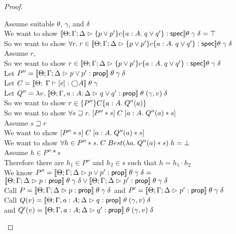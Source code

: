 \begin{proof}
\begin{tabbedproof}
    \oo Assume suitable $\theta$, $\gamma$, and $\delta$ \\
    \ooo We want to show $\interp{\judgeS{\spec{p \vee p'}{c}{a:A}{q \vee q'}}}\theta\;\gamma\;\delta = \top$ \\
    \ooo So we want to show $\forall r.\; r \in \interp{\judgeS{\spec{p \vee p'}{c}{a:A}{q \vee q'}}}\theta\;\gamma\;\delta$ \\
    \ooo Assume $r$, \\
    \oooo So we want to show $r \in\interp{\judgeS{\spec{p \vee p'}{c}{a:A}{q \vee q'}}}\theta\;\gamma\;\delta$ \\
    \oooo Let $P'' = \interp{\judgeA{p \vee p'}{\assert}}\;\theta\;\gamma\;\delta$ \\
    \oooo Let $C = \interp{\judgeE{\Gamma}{[c]}{\monad{A}}}\;\theta\;\gamma$ \\
    \oooo Let $Q'' = \semfun{v}{\interp{\judgeA[\Theta; \Gamma,a:A; \Delta]{q \vee q'}{\assert}}\;\theta\;(\gamma, v)\;\delta}$ \\
    \oooo So we want to show $r \in \spec{P''}{C}{a:A}{Q''(a)}$ \\
    \oooo So we want to show $\forall s \sqsupseteq r.\; \basicspec{P'' * s}{C}{a:A}{Q''(a) * s}$ \\
    \oooo Assume $s \sqsupseteq r$ \\
    \ooooo We want to show $\basicspec{P'' * s}{C}{a:A}{Q''(a) * s}$ \\
    \ooooo We want to show $\forall h \in P'' * s.\; C\;Best(\semfun{a}{Q''(a) * s})\;h = \bot$ \\
    \ooooo Assume $h \in P'' * s$ \\
    \oooooo Therefore there are $h_1 \in P''$ and $h_2 \in s$ such that $h = h_1 \cdot h_2$ \\
    \oooooo We know $P'' = \interp{\judgeA{p \vee p'}{\assert}}\;\theta\;\gamma\;\delta = $\\
    \oooooox $\interp{\judgeA{p}{\assert}}\;\theta\;\gamma\;\delta \vee 
                           \interp{\judgeA{p'}{\assert}}\;\theta\;\gamma\;\delta$ \\ 
    \oooooo Call $P = \interp{\judgeA{p}{\assert}}\;\theta\;\gamma\;\delta$ and $P' = \interp{\judgeA{p'}{\assert}}\;\theta\;\gamma\;\delta$ \\
    \oooooo Call $Q(v) = \interp{\judgeA[\Theta; \Gamma, a:A; \Delta]{q}{\assert}}\;\theta\;(\gamma,v)\;\delta$ \\
    \ooooox and $Q'(v) = \interp{\judgeA[\Theta; \Gamma, a:A; \Delta]{q'}{\assert}}\;\theta\;(\gamma,v)\;\delta$ \\

\end{tabbedproof}
\end{proof}
